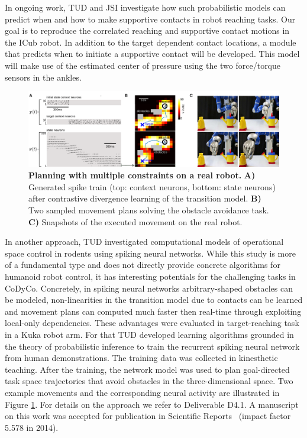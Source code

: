 In ongoing work, TUD and JSI investigate how such probabilistic models can predict when 
and how to make supportive contacts in robot reaching tasks. Our goal is to 
reproduce the correlated reaching and supportive contact motions in the ICub robot. 
In addition to the target dependent contact locations, a module that predicts 
when to initiate a supportive contact will be developed. This model will make 
use of the estimated center of pressure using the two force/torque sensors in the 
ankles. 

\begin{figure}
\centering
\includegraphics[width=\textwidth]{images/KukaLearnedModelObstacles}
 \caption[Planning in spkining neural networks with multiple constraints on a Kuka robot.]{\textbf{Planning with multiple constraints on a real robot.} {\bf A)} Generated 
spike train (top: context neurons, bottom: state neurons) after contrastive 
divergence learning of the transition model. {\bf B)} Two sampled movement plans 
solving the obstacle avoidance task. {\bf C)} Snapshots of the executed movement 
on the real robot.
}
\label{fig:exp_kukaRueckert}
\end{figure}

In another approach, TUD investigated computational models of operational space 
control in rodents using spiking neural networks. While this study is more of a 
fundamental type and does not directly provide concrete algorithms for humanoid 
robot control, it has interesting potentials for the challenging tasks in 
CoDyCo. Concretely, in spiking neural networks arbitrary-shaped obstacles can be 
modeled, non-linearities in the transition model due to contacts can be learned 
and movement plans can computed much faster then real-time through exploiting 
local-only dependencies. These advantages were evaluated in target-reaching task 
in a Kuka robot arm. For that TUD developed learning algorithms grounded in the 
theory of probabilistic inference to train the recurrent spiking neural network 
from human demonstrations. The training data was collected in kinesthetic 
teaching. After the training, the network model was used to plan goal-directed 
task space trajectories that avoid obstacles in the three-dimensional space. Two 
example movements and the corresponding neural activity are illustrated in 
Figure \ref{fig:exp_kukaRueckert}. For details on the approach we refer to 
Deliverable D4.1. A manuscript on this work was accepted for publication in 
Scientific Reports~\cite{Rueckert_SR_2016} (impact factor 5.578 in 2014). 


